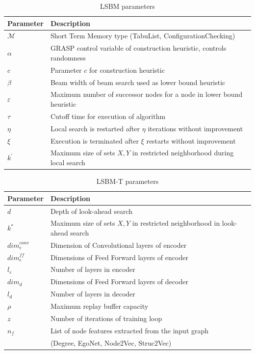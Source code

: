 \documentclass[draft,final]{vutinfth} %
\begin{document}
\begin{table}
    \centering
    \begin{tabular}{ll}
        \hline
        Parameter & Description \\ \hline
        $\mathcal{M}$ & Short Term Memory type (TabuList, ConfigurationChecking) \\
        $\alpha$ & GRASP control variable of construction heuristic, controls randomness \\
        $c$ & Parameter $c$ for construction heuristic \\
        $\beta$ & Beam width of beam search used as lower bound heuristic \\
        $\varepsilon$ & Maximum number of successor nodes for a node in lower bound heuristic \\
        $\tau$ & Cutoff time for execution of algorithm \\
        $\eta$ & Local search is restarted after $\eta$ iterations without improvement \\
        $\xi$ & Execution is terminated after $\xi$ restarts without improvement \\
        $k^\prime$ & Maximum size of sets $X, Y$ in restricted neighborhood during local search 
    \end{tabular}
    \caption{LSBM parameters}
    \label{tab:parameters-lsbm}
\end{table}

\begin{table}
    \centering
    \begin{tabular}{ll}
        \hline
        Parameter & Description \\ \hline
        $d$ & Depth of look-ahead search \\
        $k^*$ & Maximum size of sets $X,Y$ in restricted neighborhood in look-ahead search \\
        $\mathit{dim}^{\mathit{conv}}_e$ & Dimension of Convolutional layers of encoder \\
        $\mathit{dim}^{\mathit{ff}}_e$ & Dimensions of Feed Forward layers of encoder \\
        $l_e$ & Number of layers in encoder \\
        $\mathit{dim}_d$ & Dimensions of Feed Forward layers of decoder \\
        $l_d$ & Number of layers in decoder \\
        $\rho$ & Maximum replay buffer capacity \\
        $z$ & Number of iterations of training loop \\
        $n_f$ & List of node features extracted from the input graph  \\
        & (Degree, EgoNet, Node2Vec, Struc2Vec)
    \end{tabular}
    \caption{LSBM-T parameters}
    \label{tab:parameters-lsbm-t}
\end{table}
\end{document}
